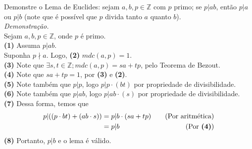 Demonstre o Lema de Euclides: sejam $a, b, p \in \mathbb{Z}$ com $p$ primo; se $p | ab$, então $p | a$ ou $p | b$ (note que é possível que $p$ divida tanto $a$ quanto $b$). \\
\emph{Demonstração.} \\
Sejam $a, b, p \in \mathbb{Z}$, onde $p$ é primo. \\
\textbf{(1)} Assuma $p | ab$. \\
Suponha $p \nmid a$. Logo, \textbf{(2)} $mdc(a, p) = 1$. \\
\textbf{(3)} Note que $\exists s, t \in \mathbb{Z}; mdc(a, p) = sa + tp$, pelo Teorema de Bezout. \\
\textbf{(4)} Note que $sa + tp = 1$, por \textbf{(3)} e \textbf{(2)}. \\
\textbf{(5)} Note também que $p | p$, logo $p | p \cdot (bt)$ por propriedade de divisibilidade. \\
\textbf{(6)} Note também que $p | ab$, logo $p | ab \cdot (s)$ por propriedade de divisibilidade. \\
\textbf{(7)} Dessa forma, temos que
\begin{align*}
    p | ((p \cdot bt) + (ab \cdot s)) & = p | b \cdot (sa + tp) & \quad \text{(Por aritmética)}   \\
                                      & = p | b                 & \quad \text{(Por \textbf{(4)})}
\end{align*}
\textbf{(8)} Portanto, $p | b$ e o lema é válido.